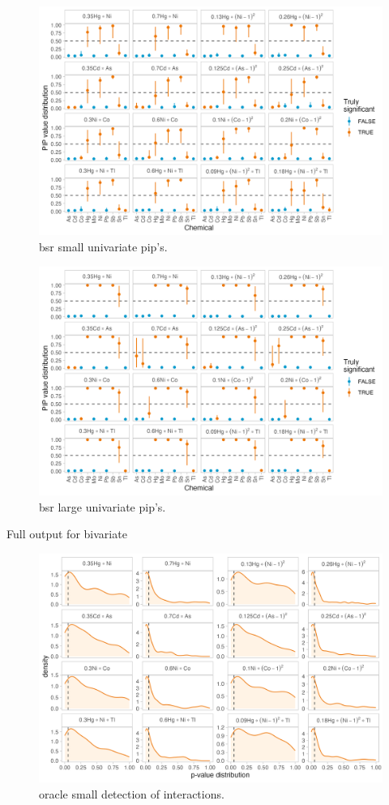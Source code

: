 \documentclass[12pt, twoside]{amherstthesis}
\begin{document}
\begin{figure}

{\centering \includegraphics[width=0.75\linewidth]{figures/ch4_ssm_univ_pips} 

}

\caption{bsr small univariate pip's.}\label{fig:ssmunivp}
\end{figure}
\begin{figure}

{\centering \includegraphics[width=0.75\linewidth]{figures/ch4_slg_univ_pips} 

}

\caption{bsr large univariate pip's.}\label{fig:slgunivp}
\end{figure}
Full output for bivariate
\begin{figure}

{\centering \includegraphics[width=0.75\linewidth]{figures/ch4_osm_biv_pval} 

}

\caption{oracle small detection of interactions.}\label{fig:osmbivp}
\end{figure}
\end{document}
